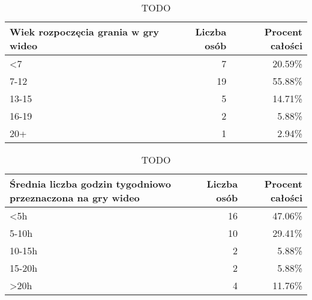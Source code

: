 \begin{table}[h!]
    \begin{center}
        \begin{tabular}{|l|r|r|}
            \hline
            Wiek rozpoczęcia grania w gry wideo & Liczba osób & Procent całości \\
            \hline
            <7                                  & 7           & 20.59\%         \\
            7-12                                & 19          & 55.88\%         \\
            13-15                               & 5           & 14.71\%         \\
            16-19                               & 2           & 5.88\%          \\
            20+                                 & 1           & 2.94\%          \\
            \hline
        \end{tabular}
    \end{center}
    \caption{TODO}\label{tab1:ch7_4}
\end{table}

\begin{table}[h!]
    \begin{center}
        \begin{tabular}{|m{15em}|r|r|}
            \hline
            Średnia liczba godzin tygodniowo \newline przeznaczona na gry wideo & Liczba osób & Procent całości \\
            \hline
            <5h                                                                 & 16          & 47.06\%         \\
            5-10h                                                               & 10          & 29.41\%         \\
            10-15h                                                              & 2           & 5.88\%          \\
            15-20h                                                              & 2           & 5.88\%          \\
            >20h                                                                & 4           & 11.76\%         \\
            \hline
        \end{tabular}
    \end{center}
    \caption{TODO}\label{tab1:ch7_5}
\end{table}

